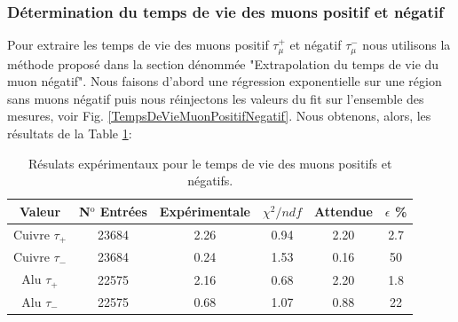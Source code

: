 \documentclass[12pt]{article}
\begin{document}
\subsubsection{Détermination du temps de vie des muons positif et négatif}

Pour extraire les temps de vie des muons positif $\tau^{+}_{\mu}$ et négatif $\tau^{-}_{\mu}$ nous utilisons la méthode proposé dans la section dénommée "Extrapolation du temps de vie du muon négatif". Nous faisons d'abord une régression exponentielle sur une région sans muons négatif puis nous réinjectons les valeurs du fit sur l'ensemble des mesures, voir Fig. \ref{TempsDeVieMuonPositifNegatif}. Nous obtenons, alors, les résultats de la Table \ref{TauPositifNegatif}:


\begin{table}[htbp!]
  \centering
  \captionsetup{width=0.9\textwidth}
  \caption{Résulats expérimentaux pour le temps de vie des muons positifs et négatifs.}
  \begin{tabular}{cccccc}
     Valeur & N$^{\text{o}}$ Entrées & Expérimentale & $\chi^{2}/ndf$  & Attendue & $\epsilon$ \%\\
    \hline
    Cuivre $\tau_{+}$ & 23684 & 2.26 & 0.94 & 2.20 & 2.7\\
    Cuivre $\tau_{-}$ & 23684 & 0.24 & 1.53 & 0.16 & 50 \\
    Alu $\tau_{+}$ & 22575 & 2.16 & 0.68 & 2.20 & 1.8\\
    Alu $\tau_{-}$ & 22575 & 0.68 & 1.07 & 0.88 & 22\\
\end{tabular}
\label{TauPositifNegatif}
\end{table}
\end{document}
